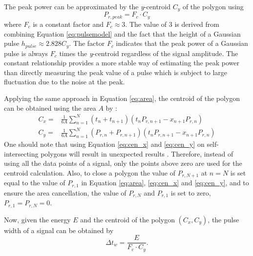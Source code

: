 The peak power can be approximated by the \textit{y}-centroid $C_y$ of the polygon using
\begin{equation}\label{eq:bm_peakpower}
    P_{r,peak}=F_c\cdot C_y
\end{equation}
where $F_c$ is a constant factor and $F_c\approx3$. The value of $3$ is derived from combining Equation \eqref{eq:pulsemodel} and the fact that the height of a Gaussian pulse $h_{pulse}\approx2.828C_y$. The factor $F_c$ indicates that the peak power of a Gaussian pulse is always $F_c$ times the \textit{y}-centroid regardless of the signal amplitude. The constant relationship provides a more stable way of estimating the peak power than directly measuring the peak value of a pulse which is subject to large fluctuation due to the noise at the peak.\par
Applying the same approach in Equation \eqref{eq:area}, the centroid of the polygon can be obtained using the area $A$ by \citep{bourke1988calculating}:
\begin{align}
\label{eq:cen_x}
C_x=&\frac{1}{6A}\sum\limits_{n=1}^{N}(t_n+t_{n+1})(t_nP_{r,n+1}-x_{n+1}P_{r,n})\\
\label{eq:cen_y}
C_y=&\frac{1}{6A}\sum\limits_{n=1}^{N}(P_{r,n}+P_{r,n+1})(t_nP_{r,n+1}-x_{n+1}P_{r,n})
\end{align}
One should note that using Equation \eqref{eq:cen_x} and \eqref{eq:cen_y} on self-intersecting polygons will result in unexpected results \citep{bourke1988calculating}. Therefore, instead of using all the data points of a signal, only the points above zero are used for the centroid calculation. Also, to close a polygon the value of $P_{r, N+1}$ at $n=N$ is set equal to the value of $P_{r,1}$ in Equation \eqref{eq:area}, \eqref{eq:cen_x} and \eqref{eq:cen_y}, and to ensure the area cancellation, the value of $P_{r,N}$ and $P_{r,1}$ is set to zero, \ie $P_{r,1}=P_{r,N}=0$.\par
Now, given the energy $E$ and the centroid of the polygon $(C_x, C_y)$, the pulse width of a signal can be obtained by
\begin{equation}
    \Delta t_w = \frac{E}{F_c\cdot C_y}.
\end{equation}
